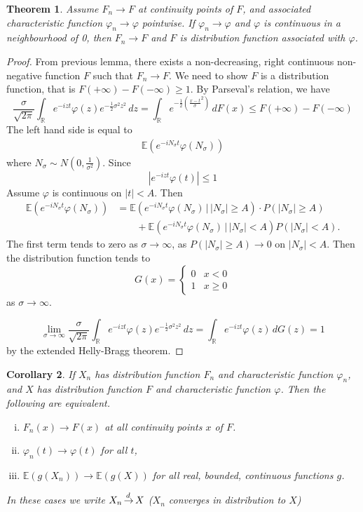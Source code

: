 \documentclass[10pt, oneside, reqno]{amsart}
\theoremstyle{plain}%
\newtheorem{thm}{Theorem}[section]
\newtheorem{cor}[thm]{Corollary}
\theoremstyle{definition}
\theoremstyle{remark}
\newcommand{\given}{ \, | \,}
\renewcommand{\phi}{\varphi}
\newcommand{\R}{\mathbb{R}}
\newcommand{\E}{\mathbb{E}}
\def\cid{\,{\buildrel \!d \over \rightarrow}\,}
\begin{document}
\begin{thm}
    Assume $F_n \rightarrow F$ at continuity points of $F$, and associated characteristic function $\phi_n \rightarrow \phi$ pointwise.  If $\phi_n \rightarrow \phi$ and $\phi$ is continuous in a neighbourhood of 0, then $F_n \rightarrow F$ and $F$ is distribution function associated with $\phi$.
\end{thm}

\begin{proof}
    From previous lemma, there exists a non-decreasing, right continuous non-negative function $F$ such that $F_n \rightarrow F$.  We need to show $F$ is a distribution function, that is $F(+ \infty) - F(-\infty) \geq 1$.  By Parseval's relation, we have \[
        \frac{\sigma}{\sqrt{2\pi}} \int_\R e^{-izt} \phi(z) e^{-\frac{1}{2}\sigma^2 z^2}\, dz = \int_\R e^{-\frac{1}{2}\left(\frac{x-t}{\sigma}^2\right)} \, dF(x) \leq F(+\infty) - F(-\infty)
    \]  The left hand side is equal to \begin{align*}
        \E(e^{-i N_\sigma t} \phi(N_\sigma))
    \end{align*} where $N_\sigma \sim N(0, \frac{1}{\sigma^2})$.  Since \[
        \left|e^{-izt} \phi(t) \right| \leq 1
    \] Assume $\phi$ is continuous on $|t| < A$.  Then \begin{align*}
        \E(e^{-iN_\sigma t} \phi(N_\sigma)) &= \E(e^{-iN_\sigma t} \phi(N_\sigma) \given |N_\sigma| \geq A ) \cdot P(|N_\sigma| \geq A) \\
                        &\qquad + \E(e^{-iN_\sigma t} \phi(N_\sigma) \given |N_\sigma| < A) P(|N_\sigma| < A).
    \end{align*}  The first term tends to zero as $\sigma \rightarrow \infty$, as $P(|N_\sigma| \geq A) \rightarrow 0$ on $|N_\sigma| < A$.  Then the distribution function tends to \[
        G(x) = \begin{cases}
            0   &x < 0 \\
            1   &x \geq 0 
        \end{cases}
    \] as $\sigma \rightarrow \infty$.  
    
    \[
        \lim_{\sigma \rightarrow \infty}\frac{\sigma}{\sqrt{2\pi}} \int_\R e^{-izt} \phi(z) e^{-\frac{1}{2}\sigma^2 z^2}\, dz = \int_\R e^{-izt} \phi(z) \, dG(z) = 1
    \] by the extended Helly-Bragg theorem.
 \end{proof} 

\begin{cor}
    If $X_n$ has distribution function $F_n$ and characteristic function $\phi_n$, and $X$ has distribution function $F$ and characteristic function $\phi$.  Then the following are equivalent.
    \begin{enumerate}[i)]
        \item $F_n(x) \rightarrow F(x)$ at all continuity points $x$ of $F$.  
        \item $\phi_n(t) \rightarrow \phi(t)$ for all $t$, 
        \item $\E(g(X_n)) \rightarrow \E(g(X))$ for all real, bounded, continuous functions $g$. 
    \end{enumerate}
    In these cases we write $X_n \cid X$ ($X_n$ converges in distribution to $X$)
\end{cor}
\end{document}
